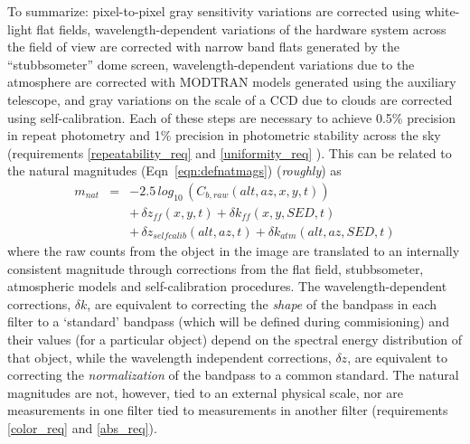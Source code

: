 \documentclass[12pt,preprint]{aastex}
\begin{document}
To summarize: pixel-to-pixel gray sensitivity variations are corrected
using white-light flat fields, wavelength-dependent
variations of the hardware system across the field of view are
corrected with narrow band flats generated by the ``stubbsometer''
dome screen, wavelength-dependent variations due to the atmosphere are
corrected with MODTRAN models generated using the auxiliary telescope,
and gray variations on the scale of a CCD due to clouds are corrected
using self-calibration. Each of these steps are necessary to achieve
0.5\% precision in repeat photometry and 1\% precision in photometric
stability across the sky (requirements \ref{repeatability_req} and
\ref{uniformity_req} ). This can be related to the natural magnitudes
(Eqn~\ref{eqn:defnatmags}) ({\it roughly}) as 
\begin{eqnarray}
\label{eqn:natmags}
m_{nat} & = &-2.5 \, log_{10} \, (C_{b, raw}(alt,az,x,y,t))  \\ 
 & & +\, \delta z_{ff}(x,y,t) + \delta k_{ff}(x,y,SED,t)  \nonumber \\  
 & &+\, \delta z_{selfcalib}(alt,az,t)  + \delta k_{atm}(alt,az,SED,t)  \nonumber
\end{eqnarray}
where the raw counts from the object in the image are translated to an
internally consistent magnitude through corrections from the flat
field, stubbsometer, atmospheric models and self-calibration
procedures. The wavelength-dependent corrections, $\delta k$, are
equivalent to correcting the {\it shape} of the bandpass in each
filter to a `standard' bandpass (which will be defined during
commisioning) and their values (for a particular object) 
depend on the spectral energy distribution of that object, while the
wavelength independent corrections, $\delta z$, are equivalent to
correcting the {\it normalization} of the bandpass to a common
standard.  The natural magnitudes are not, however, tied to an
external physical scale, nor are measurements in one filter tied to
measurements in another filter (requirements \ref{color_req} and
\ref{abs_req}).
\end{document}
